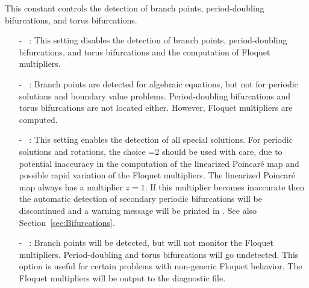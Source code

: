 This constant controls the detection of branch points,
period-doubling bifurcations, and torus bifurcations. 
\begin{itemize}
\item[-] ~:  
  This setting disables the detection of branch points, period-doubling 
  bifurcations, and torus bifurcations and the computation of 
  Floquet multipliers.
\item[-] ~:  
  Branch points are detected for algebraic equations, but not for
  periodic solutions and boundary value problems.
  Period-doubling bifurcations and torus bifurcations are not located either.
  However, Floquet multipliers are computed.
\item[-] ~: This setting enables the detection of all special 
 solutions.
 For periodic solutions and rotations, the choice =2 should be used with
 care, due to potential inaccuracy in the computation of the
 linearized Poincar\'e map and possible rapid variation of the
 Floquet multipliers.
 The linearized Poincar\'e map always has a multiplier $z=1$.
 If this multiplier becomes inaccurate
 then the automatic detection of secondary periodic
 bifurcations will be discontinued and a
 warning message will be printed in .
 See also Section~\ref{sec:Bifurcations}.
\item[-] ~:  
  Branch points will be detected, but \AUTO will not monitor the 
  Floquet multipliers. Period-doubling and torus bifurcations will go undetected. 
  This option is useful for certain problems with non-generic Floquet behavior.
  The Floquet multipliers will be output to the diagnostic file.
\end{itemize}

\subsection{}  \label{sec:ISW}


